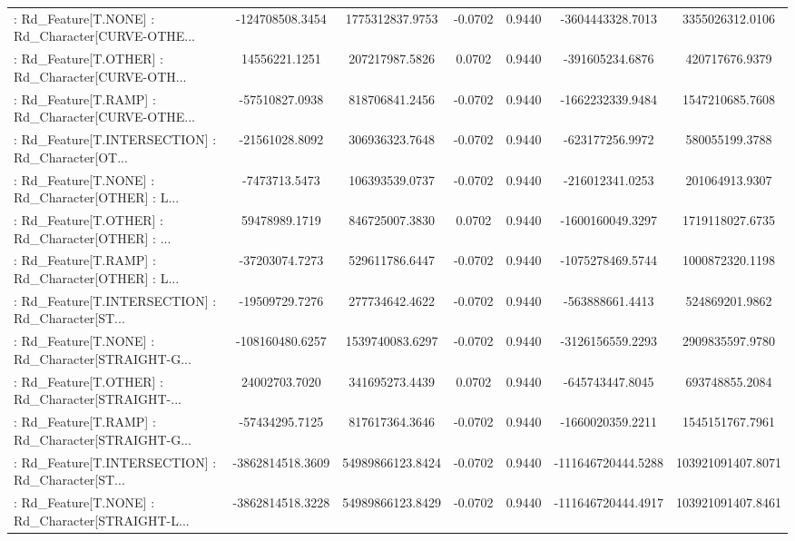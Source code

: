 \begin{longtable}{p{4cm}cccccc}
 : Rd\_Feature[T.NONE] : Rd\_Character[CURVE-OTHE... &   -124708508.3454 &   1775312837.9753 & -0.0702 &       0.9440 &   -3604443328.7013 &   3355026312.0106 \\
 : Rd\_Feature[T.OTHER] : Rd\_Character[CURVE-OTH... &     14556221.1251 &    207217987.5826 &  0.0702 &       0.9440 &    -391605234.6876 &    420717676.9379 \\
 : Rd\_Feature[T.RAMP] : Rd\_Character[CURVE-OTHE... &    -57510827.0938 &    818706841.2456 & -0.0702 &       0.9440 &   -1662232339.9484 &   1547210685.7608 \\
 : Rd\_Feature[T.INTERSECTION] : Rd\_Character[OT... &    -21561028.8092 &    306936323.7648 & -0.0702 &       0.9440 &    -623177256.9972 &    580055199.3788 \\
 : Rd\_Feature[T.NONE] : Rd\_Character[OTHER] : L... &     -7473713.5473 &    106393539.0737 & -0.0702 &       0.9440 &    -216012341.0253 &    201064913.9307 \\
 : Rd\_Feature[T.OTHER] : Rd\_Character[OTHER] : ... &     59478989.1719 &    846725007.3830 &  0.0702 &       0.9440 &   -1600160049.3297 &   1719118027.6735 \\
 : Rd\_Feature[T.RAMP] : Rd\_Character[OTHER] : L... &    -37203074.7273 &    529611786.6447 & -0.0702 &       0.9440 &   -1075278469.5744 &   1000872320.1198 \\
 : Rd\_Feature[T.INTERSECTION] : Rd\_Character[ST... &    -19509729.7276 &    277734642.4622 & -0.0702 &       0.9440 &    -563888661.4413 &    524869201.9862 \\
 : Rd\_Feature[T.NONE] : Rd\_Character[STRAIGHT-G... &   -108160480.6257 &   1539740083.6297 & -0.0702 &       0.9440 &   -3126156559.2293 &   2909835597.9780 \\
 : Rd\_Feature[T.OTHER] : Rd\_Character[STRAIGHT-... &     24002703.7020 &    341695273.4439 &  0.0702 &       0.9440 &    -645743447.8045 &    693748855.2084 \\
 : Rd\_Feature[T.RAMP] : Rd\_Character[STRAIGHT-G... &    -57434295.7125 &    817617364.3646 & -0.0702 &       0.9440 &   -1660020359.2211 &   1545151767.7961 \\
 : Rd\_Feature[T.INTERSECTION] : Rd\_Character[ST... &  -3862814518.3609 &  54989866123.8424 & -0.0702 &       0.9440 & -111646720444.5288 & 103921091407.8071 \\
 : Rd\_Feature[T.NONE] : Rd\_Character[STRAIGHT-L... &  -3862814518.3228 &  54989866123.8429 & -0.0702 &       0.9440 & -111646720444.4917 & 103921091407.8461 \\

\end{longtable}
